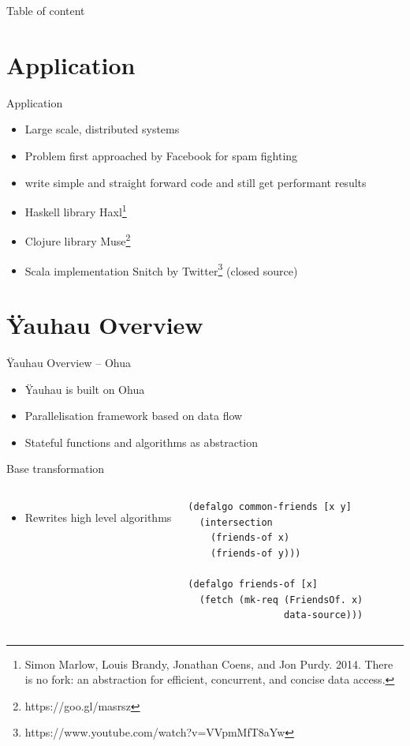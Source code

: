 \documentclass[utf8x,10pt,aspectratio=169]{beamer}
\begin{document}
\begin{frame}{Table of content}	
	\tableofcontents
\end{frame}

\section{Application}

\begin{frame}{Application}
	\begin{itemize}
		\item<2-> Large scale, distributed systems
		\item<3-> Problem first approached by Facebook for spam fighting
		\item<4-> write simple and straight forward code and still get performant results
		\item<5-> Haskell library Haxl\footnote{Simon Marlow, Louis Brandy, Jonathan Coens, and Jon Purdy. 2014. There is no fork: an abstraction for efficient, concurrent, and concise data access.}
		\item<5-> Clojure library Muse\footnote{https://goo.gl/masrsz}
		\item<5-> Scala implementation Snitch by Twitter\footnote{https://www.youtube.com/watch?v=VVpmMfT8aYw} (closed source)
	\end{itemize}
\end{frame}

\section{Ÿauhau Overview}

\begin{frame}{Ÿauhau Overview -- Ohua}
	\begin{itemize}[<+->]
		\item Ÿauhau is built on Ohua
		\item Parallelisation framework based on data flow
		\item Stateful functions and algorithms as abstraction
	\end{itemize}
\end{frame}

\begin{frame}[fragile]{Base transformation}
	
	\begin{columns}[T]
		\begin{itemize}
			\item<2-> Rewrites high level algorithms
		\end{itemize}	
\begin{verbatim}
(defalgo common-friends [x y]
  (intersection 
    (friends-of x) 
    (friends-of y)))

(defalgo friends-of [x]
  (fetch (mk-req (FriendsOf. x) 
                 data-source)))
\end{verbatim}
	\end{columns}
	
\end{frame}
\end{document}
